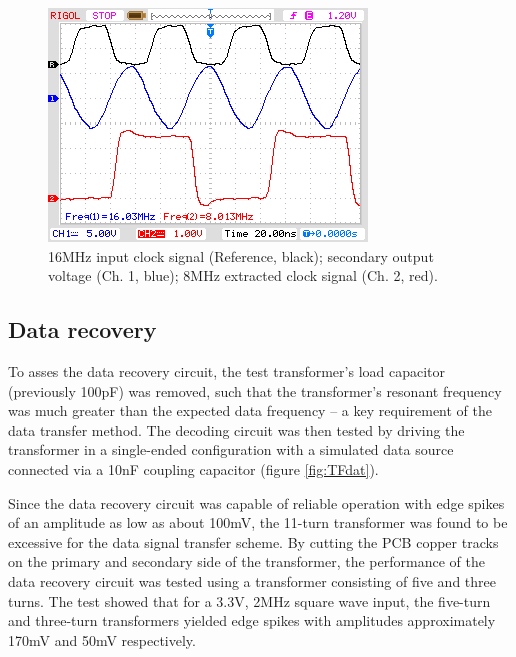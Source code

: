 \documentclass[conference]{IEEEtran}
\begin{document}
	\begin{figure}[t]
		\centering
		\includegraphics[width=0.8\columnwidth]{./img/Clock}
		\caption{16MHz input clock signal (Reference, black); secondary output voltage (Ch. 1, blue); 8MHz extracted clock signal (Ch. 2, red).}
		\label{fig:Clock}
	\end{figure}
	
	\subsection{Data recovery}
	To asses the data recovery circuit, the test transformer's load capacitor (previously 100pF) was removed, such that the transformer's resonant frequency was much greater than the expected data frequency -- a key requirement of the data transfer method.  The decoding circuit was then tested by driving the transformer in a single-ended configuration with a simulated data source connected via a 10nF coupling capacitor (figure \ref{fig:TFdat}).
	
	Since the data recovery circuit was capable of reliable operation with edge spikes of an amplitude as low as about 100mV, the 11-turn transformer was found to be excessive for the data signal transfer scheme.  By cutting the PCB copper tracks on the primary and secondary side of the transformer, the performance of the data recovery circuit was tested using a transformer consisting of five and three turns.  The test showed that for a 3.3V, 2MHz square wave input, the five-turn and three-turn transformers yielded edge spikes with amplitudes approximately 170mV and 50mV respectively.
	
\end{document}
